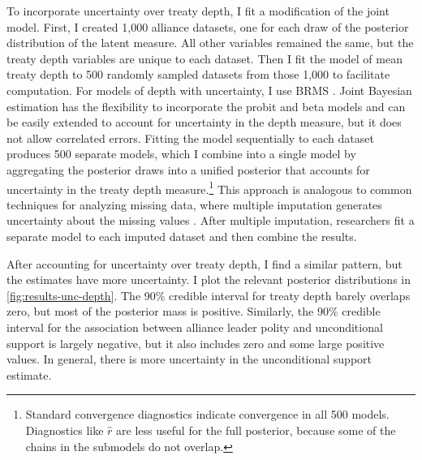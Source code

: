 \documentclass[12pt]{article}
\begin{document}
To incorporate uncertainty over treaty depth, I fit a modification of the joint model. 
First, I created 1,000 alliance datasets, one for each draw of the posterior distribution of the latent measure.
All other variables remained the same, but the treaty depth variables are unique to each dataset. 
Then I fit the model of mean treaty depth to 500 randomly sampled datasets from those 1,000 to facilitate computation. 
For models of depth with uncertainty, I use BRMS \citep{Buerkner2017}. 
Joint Bayesian estimation has the flexibility to incorporate the probit and beta models and can be easily extended to account for uncertainty in the depth measure, but it does not allow correlated errors. 
Fitting the model sequentially to each dataset produces 500 separate models, which I combine into a single model by aggregating the posterior draws into a unified posterior that accounts for uncertainty in the treaty depth measure.\footnote{Standard convergence diagnostics indicate convergence in all 500 models. Diagnostics like $\hat{r}$ are less useful for the full posterior, because some of the chains in the submodels do not overlap.}
This approach is analogous to common techniques for analyzing missing data, where multiple imputation generates uncertainty about the missing values \citep{Hollenbachetal2018imp}.
After multiple imputation, researchers fit a separate model to each imputed dataset and then combine the results. 


After accounting for uncertainty over treaty depth, I find a similar pattern, but the estimates have more uncertainty. 
I plot the relevant posterior distributions in \autoref{fig:results-unc-depth}. 
The 90\% credible interval for treaty depth barely overlaps zero, but most of the posterior mass is positive. 
Similarly, the 90\% credible interval for the association between alliance leader polity and unconditional support is largely negative, but it also includes zero and some large positive values. 
In general, there is more uncertainty in the unconditional support estimate. 
\end{document}

